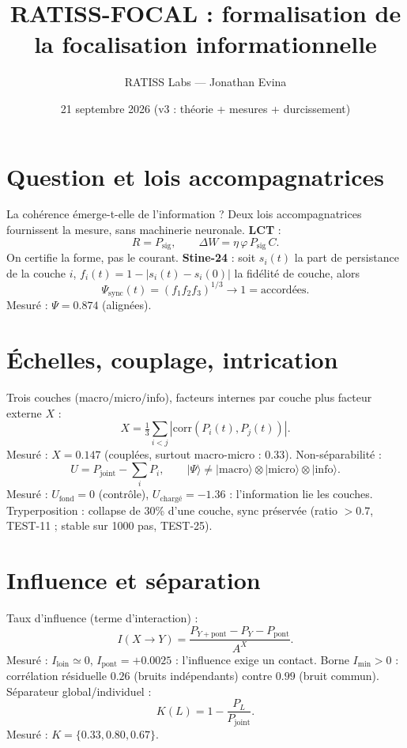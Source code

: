\documentclass[11pt,a4paper]{article}
\title{RATISS-FOCAL : formalisation de la focalisation informationnelle}
\author{RATISS Labs --- Jonathan Evina}
\date{21 septembre 2026 (v3 : théorie + mesures + durcissement)}
\begin{document}
\maketitle

\section{Question et lois accompagnatrices}
La cohérence émerge-t-elle de l'information ? Deux lois accompagnatrices
fournissent la mesure, sans machinerie neuronale.
\textbf{LCT} : %
\begin{equation}
R = P_{\mathrm{sig}}, \qquad \Delta W = \eta\,\varphi\,P_{\mathrm{sig}}\,C.
\end{equation}
On certifie la forme, pas le courant.
\textbf{Stine-24} : soit $s_i(t)$ la part de persistance de la couche $i$,
$f_i(t) = 1 - |s_i(t) - s_i(0)|$ la fidélité de couche, alors %
\begin{equation}
\Psi_{\mathrm{sync}}(t) = \left(f_1 f_2 f_3\right)^{1/3} \to 1 = \text{accordées}.
\end{equation}
Mesuré : $\Psi = 0.874$ (alignées).

\section{Échelles, couplage, intrication}
Trois couches (macro/micro/info), facteurs internes par couche plus facteur
externe $X$ : %
\begin{equation}
X = \tfrac{1}{3}\sum_{i<j} |\mathrm{corr}(P_i(t), P_j(t))|.
\end{equation}
Mesuré : $X = 0.147$ (couplées, surtout macro-micro : $0.33$).
Non-séparabilité : %
\begin{equation}
U = P_{\mathrm{joint}} - \sum_i P_i, \qquad |\Psi\rangle \neq |\mathrm{macro}\rangle \otimes |\mathrm{micro}\rangle \otimes |\mathrm{info}\rangle.
\end{equation}
Mesuré : $U_{\mathrm{fond}} = 0$ (contrôle), $U_{\mathrm{chargé}} = -1.36$ :
l'information lie les couches.
Tryperposition : collapse de 30\% d'une couche, sync préservée (ratio $> 0.7$,
TEST-11 ; stable sur 1000 pas, TEST-25).

\section{Influence et séparation}
Taux d'influence (terme d'interaction) : %
\begin{equation}
I(X \to Y) = \frac{P_{Y+\mathrm{pont}} - P_Y - P_{\mathrm{pont}}}{A^X}.
\end{equation}
Mesuré : $I_{\mathrm{loin}} \simeq 0$, $I_{\mathrm{pont}} = +0.0025$ :
l'influence exige un contact. Borne $I_{\min} > 0$ : corrélation résiduelle
$0.26$ (bruits indépendants) contre $0.99$ (bruit commun).
Séparateur global/individuel : %
\begin{equation}
K(L) = 1 - \frac{P_L}{P_{\mathrm{joint}}}.
\end{equation}
Mesuré : $K = \{0.33, 0.80, 0.67\}$.
\end{document}
